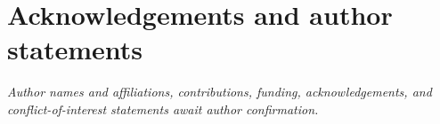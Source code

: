 \documentclass[11pt]{article}
\begin{document}
\section*{Acknowledgements and author statements}
\emph{Author names and affiliations, contributions, funding, acknowledgements, and conflict-of-interest statements await author confirmation.}



\end{document}
